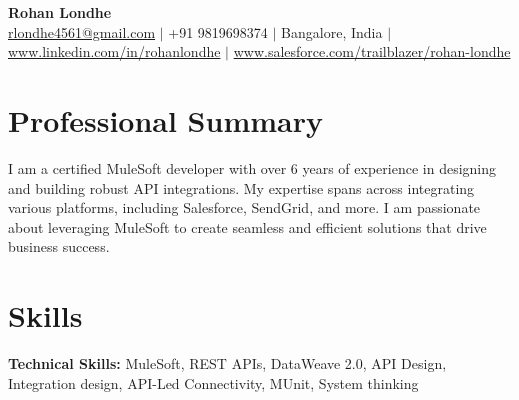 \documentclass[11pt,a4paper]{article}
\begin{document}
\begin{center}
{\LARGE\bfseries Rohan Londhe}\\[6pt]
{\small \href{mailto:rlondhe4561@gmail.com}{rlondhe4561@gmail.com} $\mid$ +91 9819698374 $\mid$ Bangalore, India $\mid$ \href{https://www.linkedin.com/in/rohanlondhe/}{www.linkedin.com/in/rohanlondhe} $\mid$ \href{https://www.salesforce.com/trailblazer/rohan-londhe}{www.salesforce.com/trailblazer/rohan-londhe}}
\end{center}
\vspace{2pt}

\section{Professional Summary}
I am a certified MuleSoft developer with over 6 years of experience in designing and building robust API integrations. My expertise spans across integrating various platforms, including Salesforce, SendGrid, and more. I am passionate about leveraging MuleSoft to create seamless and efficient solutions that drive business success.

\section{Skills}
\textbf{Technical Skills:} MuleSoft, REST APIs, DataWeave 2.0, API Design, Integration design, API-Led Connectivity, MUnit, System thinking
\end{document}
